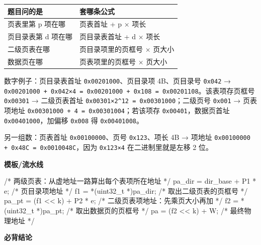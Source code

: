 \documentclass[10pt,a4paper]{ctexart}
\begin{document}
\begin{center}\small
\begin{tabularx}{\linewidth}{@{}XX@{}}
\toprule
题目问的是 & 套哪条公式 \\
\midrule
页表里第 p 项在哪 & 页表首址 + p × 项长 \\
页目录表第 d 项在哪 & 页目录表首址 + d × 项长 \\
二级页表在哪 & 页目录项里的页框号 × 页大小 \\
数据页在哪 & 页表项里的页框号 × 页大小 \\
\bottomrule
\end{tabularx}
\end{center}

数字例子：页目录表首址 \texttt{0x00201000}、页目录项 4B、页目录号 \texttt{0x042} → \texttt{0x00201000 + 0x042×4 = 0x00201000 + 0x108 = 0x00201108}。该表项存页框号 \texttt{0x00301} → 二级页表首址 \texttt{0x00301×2\textasciicircum{}12 = 0x00301000}；二级页号 \texttt{0x001} → 页表项地址 \texttt{0x00301000 + 4 = 0x00301004}；若该项存 \texttt{0x00401}，数据页首址 \texttt{0x00401000}，加偏移 \texttt{0x008} 得 \texttt{0x00401008}。

另一组数：页表首址 \texttt{0x00100000}、页号 \texttt{0x123}、项长 4B → 项地址 \texttt{0x00100000 + 0x48C = 0x0010048C}，因为 \texttt{0x123×4} 在二进制里就是左移 2 位。

\textbf{模板/流水线}

\begin{codebox}
/* 两级页表：从虚地址一路算出每个表项所在地址 */
pa_dir = dir_base + P1 * e;        /* 页目录项地址 */
f1 = *(uint32_t *)pa_dir;          /* 取出二级页表的页框号 */
pa_pt = (f1 << k) + P2 * e;        /* 二级页表项地址：先乘页大小再加 */
f2 = *(uint32_t *)pa_pt;           /* 取出数据页的页框号 */
pa = (f2 << k) + W;                /* 最终物理地址 */
\end{codebox}




\textbf{必背结论}
\end{document}
